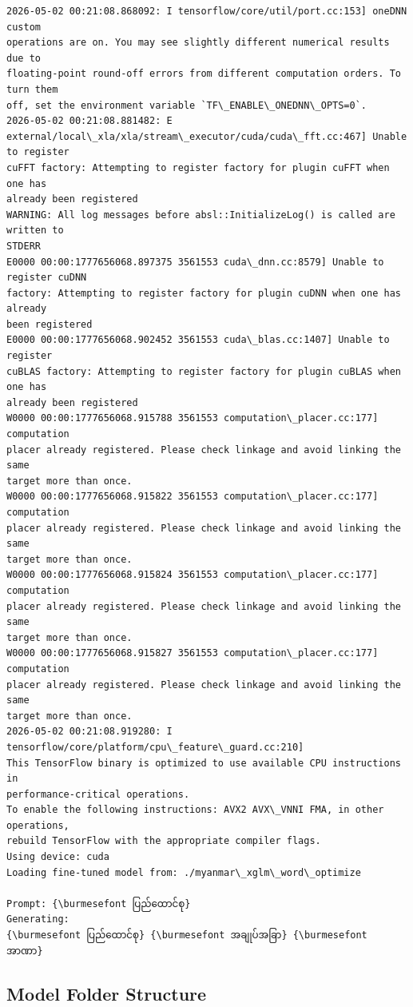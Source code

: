 \documentclass[11pt]{article}
\begin{document}
    \begin{Verbatim}[commandchars=\\\{\}]
2026-05-02 00:21:08.868092: I tensorflow/core/util/port.cc:153] oneDNN custom
operations are on. You may see slightly different numerical results due to
floating-point round-off errors from different computation orders. To turn them
off, set the environment variable `TF\_ENABLE\_ONEDNN\_OPTS=0`.
2026-05-02 00:21:08.881482: E
external/local\_xla/xla/stream\_executor/cuda/cuda\_fft.cc:467] Unable to register
cuFFT factory: Attempting to register factory for plugin cuFFT when one has
already been registered
WARNING: All log messages before absl::InitializeLog() is called are written to
STDERR
E0000 00:00:1777656068.897375 3561553 cuda\_dnn.cc:8579] Unable to register cuDNN
factory: Attempting to register factory for plugin cuDNN when one has already
been registered
E0000 00:00:1777656068.902452 3561553 cuda\_blas.cc:1407] Unable to register
cuBLAS factory: Attempting to register factory for plugin cuBLAS when one has
already been registered
W0000 00:00:1777656068.915788 3561553 computation\_placer.cc:177] computation
placer already registered. Please check linkage and avoid linking the same
target more than once.
W0000 00:00:1777656068.915822 3561553 computation\_placer.cc:177] computation
placer already registered. Please check linkage and avoid linking the same
target more than once.
W0000 00:00:1777656068.915824 3561553 computation\_placer.cc:177] computation
placer already registered. Please check linkage and avoid linking the same
target more than once.
W0000 00:00:1777656068.915827 3561553 computation\_placer.cc:177] computation
placer already registered. Please check linkage and avoid linking the same
target more than once.
2026-05-02 00:21:08.919280: I tensorflow/core/platform/cpu\_feature\_guard.cc:210]
This TensorFlow binary is optimized to use available CPU instructions in
performance-critical operations.
To enable the following instructions: AVX2 AVX\_VNNI FMA, in other operations,
rebuild TensorFlow with the appropriate compiler flags.
Using device: cuda
Loading fine-tuned model from: ./myanmar\_xglm\_word\_optimize

Prompt: {\burmesefont ပြည်ထောင်စု}
Generating:
{\burmesefont ပြည်ထောင်စု} {\burmesefont အချုပ်အခြာ} {\burmesefont အာဏာ}
    \end{Verbatim}

    \hypertarget{model-folder-structure}{%
\subsection{Model Folder Structure}\label{model-folder-structure}}
\end{document}
